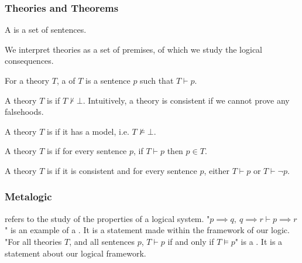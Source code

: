 \documentclass[11pt]{article}
\begin{document}
\subsubsection{Theories and Theorems}
\begin{defi}
    [Theory]
    A  is a set of sentences.
\end{defi}
We interpret theories as a set of premises, of which we study the logical consequences.
\begin{defi}
    [Theorem]
    For a theory $T$, a  of $T$ is a sentence $p$ such that $T \vdash p$.
\end{defi}
\begin{defi}
    A theory $T$ is  if $T \not\vdash \bot$.
    Intuitively, a theory is consistent if we cannot prove any falsehoods.
\end{defi}
\begin{defi}
    A theory $T$ is  if it has a model, i.e. $T \not\vDash \bot$.
\end{defi}
\begin{defi}
    A theory $T$ is  if for every sentence $p$, if $T \vdash p$ then $p \in T$.
\end{defi}
\begin{defi}
    A theory $T$ is  if it is consistent and for every sentence $p$, either $T \vdash p$ or $T \vdash \neg p$.
\end{defi}
\subsubsection{Metalogic}
\label{sec:informalMetalogic}
 refers to the study of the properties of a logical system.
\mypar
"$p \implies q, \ q \implies r \vdash p \implies r$" is an example of a . It is a statement made within the framework of our logic.
\mypar
"For all theories $T$, and all sentences $p$, $T \vdash p$ if and only if $T \vDash p$" is a . It is a statement about our logical framework.
\pagebreak
\end{document}
